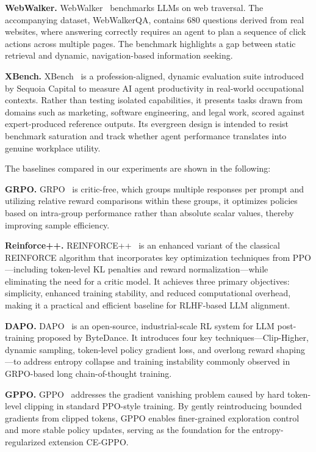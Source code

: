 \documentclass{llmxive}
\begin{document}
\noindent\textbf{WebWalker.} WebWalker~\cite{wu2025webwalker} benchmarks LLMs on web traversal. The accompanying dataset, WebWalkerQA, contains 680 questions derived from real websites, where answering correctly requires an agent to plan a sequence of click actions across multiple pages. The benchmark highlights a gap between static retrieval and dynamic, navigation-based information seeking.

\noindent\textbf{XBench.} XBench~\cite{chen2025xbench} is a profession-aligned, dynamic evaluation suite introduced by Sequoia Capital to measure AI agent productivity in real-world occupational contexts. Rather than testing isolated capabilities, it presents tasks drawn from domains such as marketing, software engineering, and legal work, scored against expert-produced reference outputs. Its evergreen design is intended to resist benchmark saturation and track whether agent performance translates into genuine workplace utility.

The baselines compared in our experiments are shown in the following:

 

\noindent\textbf{GRPO.} GRPO~\cite{guo2025deepseek} is critic-free, which groups multiple responses per prompt and utilizing relative reward comparisons within these groups, it optimizes policies based on intra-group performance rather than absolute scalar values, thereby improving sample efficiency.

\noindent\textbf{Reinforce++.}  REINFORCE++~\cite{hu2025reinforce++} is an enhanced variant of the classical REINFORCE algorithm that incorporates key optimization techniques from PPO—including token-level KL penalties and reward normalization—while eliminating the need for a critic model. It achieves three primary objectives: simplicity, enhanced training stability, and reduced computational overhead, making it a practical and efficient baseline for RLHF-based LLM alignment.

\noindent\textbf{DAPO.} DAPO~\cite{yu2025dapo}  is an open-source, industrial-scale RL system for LLM post-training proposed by ByteDance. It introduces four key techniques—Clip-Higher, dynamic sampling, token-level policy gradient loss, and overlong reward shaping—to address entropy collapse and training instability commonly observed in GRPO-based long chain-of-thought training.

\noindent\textbf{GPPO.} GPPO~\cite{su2025klear}  addresses the gradient vanishing problem caused by hard token-level clipping in standard PPO-style training. By gently reintroducing bounded gradients from clipped tokens, GPPO enables finer-grained exploration control and more stable policy updates, serving as the foundation for the entropy-regularized extension CE-GPPO.
\end{document}
